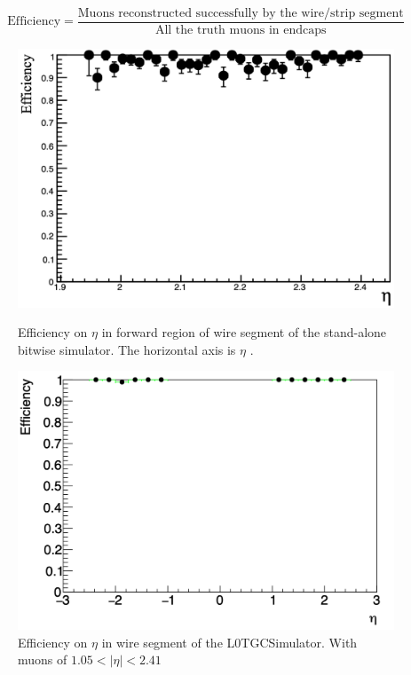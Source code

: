 \begin{equation}
\label{eq:simulator_efficiency}
\mathrm{Efficiency} = \frac{\text{Muons reconstructed successfully by the wire/strip segment}}{\text{All the truth muons in endcaps}}
\end{equation}

\begin{figure}[htbp]
  \begin{minipage}{0.485\textwidth}
    \centering
    \vspace{-2mm}
    \includegraphics[width=\linewidth]{figs/chapter5/yamashita_wire_eff_new.png}
    \caption{Efficiency on $\eta$ in forward region of wire segment of the stand-alone bitwise simulator. The horizontal axis is $\eta$ \cite{yamashita}.}
    \label{fig:yama_wire}
  \end{minipage}
  \hfill
  \begin{minipage}{0.505\textwidth}
    \centering
    \includegraphics[width=\linewidth]{figs/chapter5/eff_wire_eta_big.png}
    \caption{Efficiency on $\eta$ in wire segment of the L0TGCSimulator. With muons of $1.05 < |\eta| < 2.41$}
    \label{fig:eff_wire_eta}
  \end{minipage}
\end{figure}

